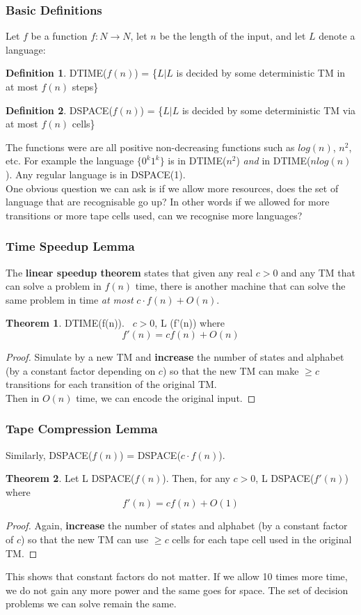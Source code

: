 \documentclass{article}
\theoremstyle{definition}
\newtheorem{definition}{Definition}[section]
\newtheorem{theorem}{Theorem}[section]
\newcommand{\n}[0]{\\[\baselineskip]}
\begin{document}
\subsubsection{Basic Definitions}
Let $f$ be a function $f : N \rightarrow N$, let $n$ be the length of the input, and let $L$ denote a language:
\begin{definition}
\textsc{DTIME}($f(n)$) = \{$L | L$ is decided by some deterministic TM in at most $f(n)$ steps\}
\end{definition}
\begin{definition}
\textsc{DSPACE}($f(n)$) = \{$L | L$ is decided by some deterministic TM via at most $f(n)$ cells\}
\end{definition}
\noindent
The functions were are all positive non-decreasing functions such as $log(n)$, $n^2$, etc. For example the language $\{0^k1^k\}$ is in \textsc{DTIME}($n^2$) \textit{and} in \textsc{DTIME}($nlog(n)$). Any regular language is in \textsc{DSPACE}(1).
\n
One obvious question we can ask is if we allow more resources, does the set of language that are recognisable go up? In other words if we allowed for more transitions or more tape cells used, can we recognise more languages?
\subsubsection{Time Speedup Lemma}
The \textbf{linear speedup theorem} states that given any real $c > 0$ and any TM that can solve a problem in $f(n)$ time, there is another machine that can solve the same problem in time \textit{at most} $c \cdot f(n) + O(n)$.
\begin{theorem}
 \in DTIME(f(n)). \ $c > 0$, L \in {}(f'(n)) where
\[f'(n) = cf(n) + O(n)\]
\end{theorem}
\begin{proof}
Simulate by a new TM and \textbf{increase} the number of states and alphabet (by a constant factor depending on $c$) so that the new TM can make $\geq c$ transitions for each transition of the original TM. \\ Then in $O(n)$ time, we can encode the original input.
\end{proof}
\subsubsection{Tape Compression Lemma}
Similarly, \textsc{DSPACE}($f(n)$) = \textsc{DSPACE}($c \cdot f(n)$).
\begin{theorem}
Let L \in \textsc{DSPACE}($f(n)$). Then, for any $c > 0$, L \in DSPACE($f'(n)$) where
\[f'(n) = cf(n) + O(1)\]
\end{theorem}
\begin{proof}
Again, \textbf{increase} the number of states and alphabet (by a constant factor of $c$) so that the new TM can use $\geq c$ cells for each tape cell used in the original TM.
\end{proof}
\noindent
This shows that constant factors do not matter. If we allow 10 times more time, we do not gain any more power and the same goes for space. The set of decision problems we can solve remain the same. 
\end{document}
